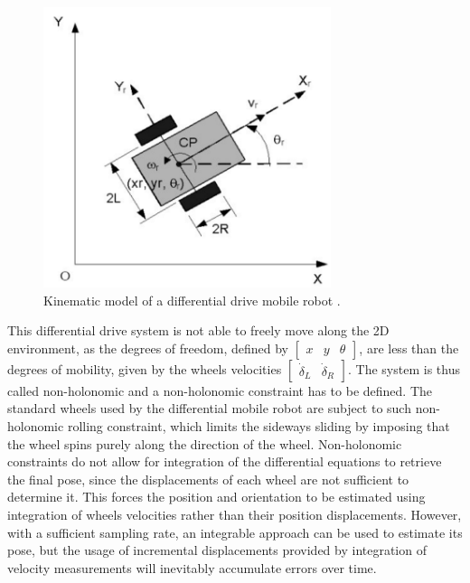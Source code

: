 \begin{figure}[!ht]
  \begin{center}
    \includegraphics[width=0.75\textwidth]{Images/2-Background/Kinematics-2021-04-23 13-55-11.png}
  \end{center}
  \caption{Kinematic model of a differential drive mobile robot \cite{trajectory}.}
  \label{fig:kine}
\end{figure}

This differential drive system is not able to freely move along the \gls{2D} environment, as the degrees of freedom, defined by $\begin{bmatrix}x&y&\theta\end{bmatrix}$, are less than the degrees of mobility, given by the wheels velocities $\begin{bmatrix}\dot \delta _L & \dot \delta _R\end{bmatrix}$.
The system is thus called non-holonomic and a non-holonomic constraint has to be defined.
The standard wheels used by the differential mobile robot are subject to such non-holonomic rolling constraint, which limits the sideways sliding by imposing that the wheel spins purely along the direction of the wheel.
Non-holonomic constraints do not allow for integration of the differential equations to retrieve the final pose, since the displacements of each wheel are not sufficient to determine it.
This forces the position and orientation to be estimated using integration of wheels velocities rather than their position displacements.
However, with a sufficient sampling rate, an integrable approach can be used to estimate its pose, but the usage of incremental displacements provided by integration of velocity measurements will inevitably accumulate errors over time.


